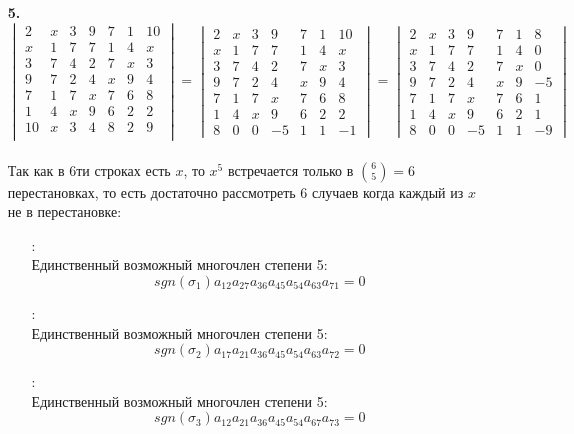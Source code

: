 \documentclass[a4paper]{article}
\renewcommand{\det}[1]{\begin{vmatrix} #1 \end{vmatrix}}
\begin{document}
\begin{enumerate}
    \item[\textbf{5.}]$\det{2 & x & 3 & 9 & 7 & 1 & 10 \\
    x & 1 & 7 & 7 & 1 & 4 & x \\
    3 & 7 & 4 & 2 & 7 & x & 3 \\
    9 & 7 & 2 & 4 & x & 9 & 4 \\
    7 & 1 & 7 & x & 7 & 6 & 8 \\
    1 & 4 & x & 9 & 6 & 2 & 2 \\
    10 & x & 3 & 4 & 8 & 2 & 9 \\} =\det{2 & x & 3 & 9 & 7 & 1 & 10 \\ x & 1 & 7 & 7 & 1 & 4 & x \\ 3 & 7 & 4 & 2 & 7 & x & 3 \\ 9 & 7 & 2 & 4 & x & 9 & 4 \\ 7 & 1 & 7 & x & 7 & 6 & 8 \\ 1 & 4 & x & 9 & 6 & 2 & 2 \\ 8 & 0 & 0 & -5 & 1 & 1 & -1} = 
    \det{2 & x & 3 & 9 & 7 & 1 & 8 \\ x & 1 & 7 & 7 & 1 & 4 & 0 \\ 3 & 7 & 4 & 2 & 7 & x & 0 \\ 9 & 7 & 2 & 4 & x & 9 & -5 \\ 7 & 1 & 7 & x & 7 & 6 & 1 \\ 1 & 4 & x & 9 & 6 & 2 & 1 \\ 8 & 0 & 0 & -5 & 1 & 1 & -9}$\\\\
    Так как в 6ти строках есть $x$, то $x^5$ встречается только в $\binom{6}{5} = 6$ перестановках, то есть достаточно рассмотреть 6 случаев когда каждый из $x$ не в перестановке:
    \begin{enumerate}
        \item[]: \\
        Единственный возможный многочлен степени 5: 
        $$sgn(\sigma_1)a_{12}a_{27}a_{36}a_{45}a_{54}a_{63}a_{71} = 0$$
        \item[]: \\
        Единственный возможный многочлен степени 5: 
        $$sgn(\sigma_2)a_{17}a_{21}a_{36}a_{45}a_{54}a_{63}a_{72} = 0$$
        \item[]: \\
        Единственный возможный многочлен степени 5: 
        $$sgn(\sigma_3)a_{12}a_{21}a_{36}a_{45}a_{54}a_{67}a_{73} = 0$$

\end{enumerate}
\end{enumerate}
\end{document}
